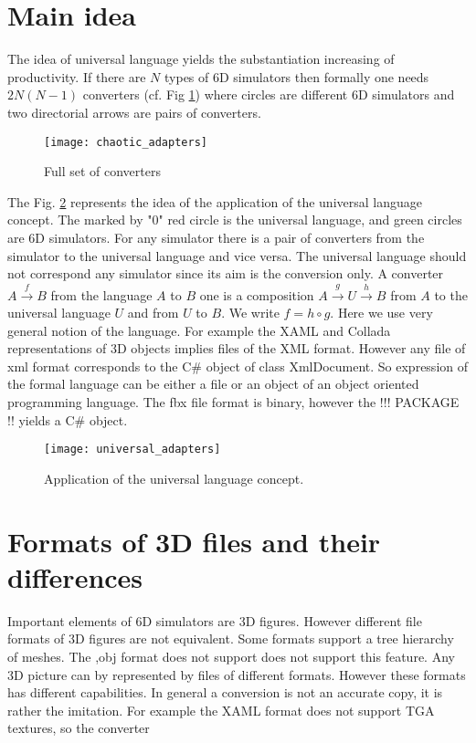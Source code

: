 \documentclass[10pt,journal,compsoc]{IEEEtran}
\begin{document}
	
	
		\section{Main idea}
	The idea of universal language yields the substantiation  increasing of productivity. 	If there are $N$ types of 6D simulators  then formally one needs $2N\left( N-1\right) $ converters (cf. Fig \ref{fig_sim}) where circles are different 6D simulators and two directorial arrows are pairs of converters.	
		\begin{figure}[!t]
		\centering
		\texttt{[image: chaotic\_adapters]}
		\caption{Full set of converters}
		\label{fig_sim}
	\end{figure}
	The Fig. \ref{fig_uni} represents the idea of the  application of the universal language concept. The marked by "0" red circle is the universal language, and green circles are 6D simulators. For any simulator there is a pair of converters from the simulator to the universal language and vice versa.  The universal language should not correspond any simulator since its aim is the conversion only. A converter $A \xrightarrow{f} B$ from the language $A$ to $B$ one is a composition $A\xrightarrow{g} U \xrightarrow{h} B$ from $A$ to the universal language $U$ and from $U$ to $B$. We write $f = h \circ g$. Here we use very general notion of the language. For example the XAML and Collada representations of 3D objects implies files of the XML format. However any file of xml format corresponds to the C\# object of class XmlDocument. So expression of the formal language can be either a file or an object of an object oriented programming language. The fbx file format is binary, however the !!! PACKAGE !! yields a  C\# object.
	
			\begin{figure}[!t]
		\centering
		\texttt{[image: universal\_adapters]}
		\caption{Application of the universal language concept.}
		\label{fig_uni}
	\end{figure}
	
	\section{Formats of 3D files and their differences}
Important elements of 6D simulators are 3D figures. However different  file formats of 3D figures are not equivalent. Some formats support a tree hierarchy  of meshes. The ,obj format does not support does not support this feature.
	Any 3D picture can by represented by files of different formats. However these formats has different capabilities. In general a conversion is not an accurate copy, it is rather the imitation. For example the XAML format does not support TGA textures, so the converter 
	
\end{document}
